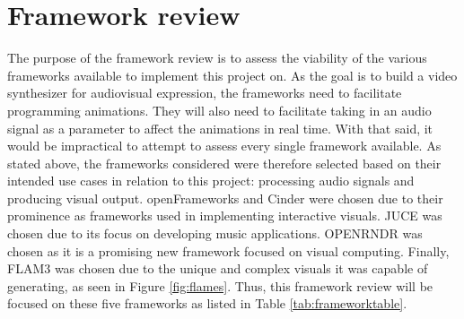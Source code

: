 \documentclass[../initial_thesis.tex]{subfiles}
\begin{document}
\section{Framework review}\label{sec:frameworkreview}
The purpose of the framework review is to assess the viability of the various frameworks available to implement this project on. As the goal is to build a video synthesizer for audiovisual expression, the frameworks need to facilitate programming animations. They will also need to facilitate taking in an audio signal as a parameter to affect the animations in real time. With that said, it would be impractical to attempt to assess every single framework available. As stated above, the frameworks considered were therefore selected based on their intended use cases in relation to this project: processing audio signals and producing visual output. openFrameworks and Cinder were chosen due to their prominence as frameworks used in implementing interactive visuals. JUCE was chosen due to its focus on developing music applications. OPENRNDR was chosen as it is a promising new framework focused on visual computing. Finally, FLAM3 was chosen due to the unique and complex visuals it was capable of generating, as seen in Figure \ref{fig:flames}. Thus, this framework review will be focused on these five frameworks as listed in Table \ref{tab:frameworktable}. 
\end{document}
